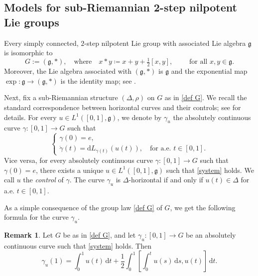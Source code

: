 \documentclass[a4paper,11pt,reqno]{amsart}
\theoremstyle{plain}
\theoremstyle{definition}
\newtheorem{remark}[theorem]{Remark}
\newcommand{\g}{\mathfrak{g}}
\newcommand{\id}{e}
\newcommand{\de}{\mathrm{d}}
\newcommand{\coloneq}{\coloneqq}
\begin{document}
\subsection{Models for sub-Riemannian 2-step nilpotent Lie groups} \label{model}
Every simply connected, $2$-step nilpotent Lie group with associated Lie algebra $\g$ is isomorphic to 
\begin{equation} \label{def G}
 G:= (\g,*), \quad \text{where} \quad x*y \coloneq x+y+\tfrac{1}{2}[x,y], \qquad \text{ for all } x,y \in \g.
\end{equation}
Moreover, the Lie algebra associated with $(\g,*)$ is $\g$ and the exponential map $\exp \colon \g \to (\g,*)$ is the identity map; see \cite[Theorem~11.2.6]{hilgert2011structure}.

Next, fix a sub-Riemannian structure $(\Delta,\rho)$ on $G$ as in \eqref{def G}. We recall the standard correspondence between horizontal curves and their controls; see \cite[Section~7.2.1]{donne2024metricliegroupscarnotcaratheodory} for details. For every $u \in L^1([0,1],\g)$, we denote by $\gamma_u$ the absolutely continuous curve $\gamma \colon [0,1] \to G$ such that 
\begin{equation} \label{system}
 \begin{cases}
 \gamma(0)=\id, \\ \dot{\gamma}(t)= \de L_{\gamma(t)}(u(t)), \quad \text{for a.e. $t \in [0,1]$.}
 \end{cases}
\end{equation}
Vice versa, for every absolutely continuous curve $\gamma \colon [0,1] \to G$ such that $\gamma(0)=\id$, there exists a unique $u \in L^1([0,1],\g)$ such that \eqref{system} holds. We call $u$ the {\em control} of $\gamma$. The curve $\gamma_u$ is $\Delta$-horizontal if and only if $u(t) \in \Delta$ for a.e. $t \in [0,1]$.

 As a simple consequence of the group law \eqref{def G} of $G$, we get the following formula for the curve $\gamma_u$.

\begin{remark} \label{lemma integral}
	Let $G$ be as in \eqref{def G}, and let $\gamma_u \colon [0,1] \to G$ be an absolutely continuous curve such that \eqref{system} holds. Then
	\begin{equation} \label{formula integral}
		\gamma_u(1) = \int^1_0 u(t) \, \de t + \frac{1}{2} \int^1_0 \left[\int^t_0 u(s) \, \de s, u(t) \right] \, \de t. 
	\end{equation}
\end{remark}
\end{document}
